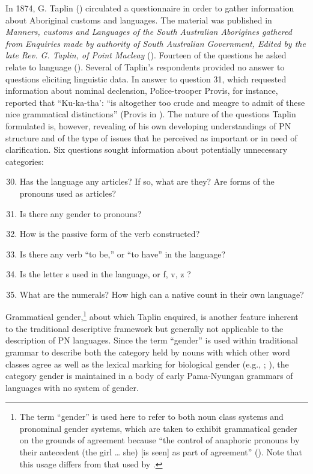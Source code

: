 In 1874, G. Taplin () circulated a questionnaire in order to gather information about Aboriginal customs and languages. The material was published in \textit{Manners, customs and Languages of the South Australian Aborigines gathered from Enquiries made by authority of South Australian Government, Edited by the late Rev. G. Taplin, of Point Macleay }(\citeyear{taplin_1879a_nodate}). Fourteen of the questions he asked relate to language (\citeyear[6]{taplin_1879a_nodate}). Several of Taplin’s respondents provided no answer to questions eliciting linguistic data. In answer to question 31, which requested information about nominal declension, Police-trooper Provis, for instance, reported that “Ku-ka-tha’: “is altogether too crude and meagre to admit of these nice grammatical distinctions” (Provis in \citeyear[97]{taplin_1879a_nodate}). The nature of the questions Taplin formulated is, however, revealing of his own developing understandings of PN structure and of the type of issues that he perceived as important or in need of clarification. Six questions sought information about potentially unnecessary categories:

\begin{enumerate}
    \setcounter{enumi}{29}
    \item Has the language any articles? If so, what are they? Are forms of the pronouns used as articles?
    \setcounter{enumi}{34}
    \item Is there any gender to pronouns?
    \setcounter{enumi}{37}
    \item How is the passive form of the verb constructed?
    \item Is there any verb “to be,” or “to have” in the language?
    \item Is the letter s used in the language, or f, v, z ?
    \item What are the numerals? How high can a native count in their own language?
\end{enumerate}

Grammatical gender,\footnote{The term “gender” is used here to refer to both noun class systems and pronominal gender systems, which are taken to exhibit grammatical gender on the grounds of agreement because “the control of anaphoric pronouns by their antecedent (the girl … she) [is seen] as part of agreement” (\citealt{corbett_number_2013}). Note that this usage differs from that used by \citet[452]{dixon_australian_2002}.}  about which Taplin enquired, is another feature inherent to the traditional descriptive framework but generally not applicable to the description of PN languages. Since the term “gender” is used within traditional grammar to describe both the category held by nouns with which other word classes agree as well as the lexical marking for biological gender (e.g., \citealt[10--11]{gildersleeve_latin_1895}; \citealt[19--32]{ramshorn_lateinische_1824}), the category gender is maintained in a body of early Pama-Nyungan grammars of languages with no system of gender. 	

